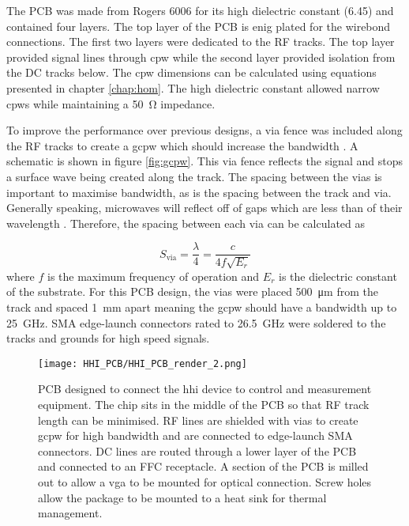 The PCB was made from Rogers 6006 for its high dielectric constant (6.45) and contained four layers. The top layer of the PCB is \ac{enig} plated for the wirebond connections. The first two layers were dedicated to the RF tracks. The top layer provided signal lines through \ac{cpw} while the second layer provided isolation from the DC tracks below. The \ac{cpw} dimensions can be calculated using equations presented in chapter \ref{chap:hom}. The high dielectric constant allowed narrow \acp{cpw} while maintaining a \SI{50}{\ohm} impedance. 

To improve the performance over previous designs, a via fence was included along the RF tracks to create a \ac{gcpw} which should increase the bandwidth \cite{haydl2002use}. A schematic is shown in figure \ref{fig:gcpw}. This via fence reflects the signal and stops a surface wave being created along the track. The spacing between the vias is important to maximise bandwidth, as is the spacing between the track and via. Generally speaking, microwaves will reflect off of gaps which are less than  of their wavelength \cite{Sain2016}. Therefore, the spacing between each via can be calculated as 

\begin{equation}
	S_\text{via} = \frac{\lambda}{4} = \frac{c}{4 f \sqrt{E_r}}
\end{equation}
where $f$ is the maximum frequency of operation and $E_r$ is the dielectric constant of the substrate. For this PCB design, the vias were placed \SI{500}{\um} from the track and spaced \SI{1}{\mm} apart meaning the \ac{gcpw} should have a bandwidth up to \SI{25}{GHz}. SMA edge-launch connectors rated to \SI{26.5}{GHz} were soldered to the tracks and grounds for high speed signals.

\begin{figure}[t]
	\centering
	\texttt{[image: HHI\_PCB/HHI\_PCB\_render\_2.png]}
	\caption[PCB breakout for an InP integrated circuit]{PCB designed to connect the \acs{hhi} device to control and measurement equipment. The chip sits in the middle of the PCB so that RF track length can be minimised. RF lines are shielded with vias to create \acs{gcpw} for high bandwidth and are connected to edge-launch SMA connectors. DC lines are routed through a lower layer of the PCB and connected to an FFC receptacle. A section of the PCB is milled out to allow a \acs{vga} to be mounted for optical connection. Screw holes allow the package to be mounted to a heat sink for thermal management.}
	\label{fig:hhi_pcb}
\end{figure}


